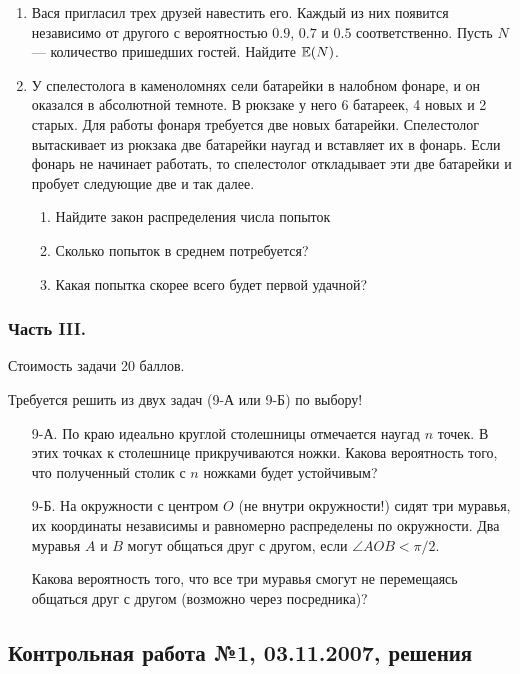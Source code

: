 \begin{enumerate}
\item Вася пригласил трех друзей навестить его. Каждый из них появится
независимо от другого с вероятностью $0.9$, $0.7$ и $0.5$
соответственно. Пусть $N$ — количество пришедших гостей. Найдите $\mathbb{E}(N)$.

\item У спелестолога в каменоломнях сели батарейки в налобном фонаре, и он оказался в абсолютной темноте. В рюкзаке у него 6 батареек, 4 новых и 2 старых. Для работы фонаря требуется две новых батарейки. Спелестолог вытаскивает из рюкзака две батарейки наугад и вставляет их в фонарь. Если фонарь не начинает работать, то спелестолог откладывает эти две батарейки и пробует следующие две и так далее.
\begin{enumerate}
\item Найдите закон распределения числа попыток
\item Сколько попыток в среднем потребуется?
\item Какая попытка скорее всего будет первой удачной?
\end{enumerate}
\end{enumerate}

\subsubsection*{Часть III.}

Стоимость задачи 20 баллов.

Требуется решить \textbf{} из двух задач (9-А или 9-Б) по
выбору!

\begin{enumerate}
\item[9-А.] По краю идеально круглой столешницы отмечается наугад $n$ точек. В этих точках к столешнице прикручиваются ножки. Какова вероятность того, что полученный столик с $n$ ножками будет устойчивым?

\item[9-Б.] На окружности  с центром $O$ (не внутри окружности!) сидят три муравья, их
координаты независимы и равномерно распределены по окружности. Два
муравья $A$ и $B$ могут общаться друг с другом, если $\angle AOB<\pi/2$.

Какова вероятность того, что все три муравья смогут не перемещаясь
общаться друг с другом (возможно через посредника)?
\end{enumerate}



\subsection{Контрольная работа №1, 03.11.2007, решения}

